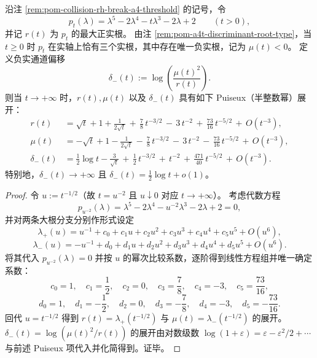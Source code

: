 
\begin{proposition}\label{prop:pom-a4t-puiseux-expansion-and-delta-asymptotics}
沿注 \ref{rem:pom-collision-rh-break-a4-threshold} 的记号，令
\[
p_t(\lambda)=\lambda^{5}-2\lambda^{4}-t\lambda^{3}-2\lambda+2\qquad(t>0),
\]
并记 \(r(t)\) 为 \(p_t\) 的最大正实根。
由注 \ref{rem:pom-a4t-discriminant-root-type}，当 \(t\ge 0\) 时 \(p_t\) 在实轴上恰有三个实根，其中存在唯一负实根，记为 \(\mu(t)<0\)。
定义负实通道偏移
\[
\delta_{-}(t):=\log\!\left(\frac{\mu(t)^2}{r(t)}\right).
\]
则当 \(t\to+\infty\) 时，\(r(t),\mu(t)\) 以及 \(\delta_{-}(t)\) 具有如下 Puiseux（半整数幂）展开：
\[
\begin{aligned}
r(t)
&=\sqrt t+1+\frac{1}{2\sqrt t}
\,+\,\frac{7}{8}\,t^{-3/2}
\,-\,3\,t^{-2}
\,+\,\frac{73}{16}\,t^{-5/2}
\, +\,O(t^{-3}),
\\[2pt]
\mu(t)
&=-\sqrt t+1-\frac{1}{2\sqrt t}
\,-\,\frac{7}{8}\,t^{-3/2}
\,-\,3\,t^{-2}
\,-\,\frac{73}{16}\,t^{-5/2}
\, +\,O(t^{-3}),
\\[2pt]
\delta_{-}(t)
&=\frac12\log t-\frac{3}{\sqrt t}
\,+\,\frac12\,t^{-3/2}
\,+\,t^{-2}
\,+\,\frac{471}{40}\,t^{-5/2}
\, +\,O(t^{-3}).
\end{aligned}
\]
特别地，\(\delta_{-}(t)\to+\infty\) 且 \(\delta_{-}(t)=\frac12\log t+o(1)\)。
\end{proposition}
\begin{proof}
令 \(u:=t^{-1/2}\)（故 \(t=u^{-2}\) 且 \(u\downarrow 0\) 对应 \(t\to+\infty\)）。
考虑代数方程
\[
p_{u^{-2}}(\lambda)=\lambda^5-2\lambda^4-u^{-2}\lambda^3-2\lambda+2=0,
\]
并对两条大根分支分别作形式设定
\[
\lambda_{+}(u)=u^{-1}+c_0+c_1u+c_2u^2+c_3u^3+c_4u^4+c_5u^5+O(u^6),
\]
\[
\lambda_{-}(u)=-u^{-1}+d_0+d_1u+d_2u^2+d_3u^3+d_4u^4+d_5u^5+O(u^6).
\]
将其代入 \(p_{u^{-2}}(\lambda)=0\) 并按 \(u\) 的幂次比较系数，逐阶得到线性方程组并唯一确定系数：
\[
c_0=1,\quad c_1=\frac12,\quad c_2=0,\quad c_3=\frac78,\quad c_4=-3,\quad c_5=\frac{73}{16},
\]
\[
d_0=1,\quad d_1=-\frac12,\quad d_2=0,\quad d_3=-\frac78,\quad d_4=-3,\quad d_5=-\frac{73}{16}.
\]
回代 \(u=t^{-1/2}\) 得到 \(r(t)=\lambda_{+}(t^{-1/2})\) 与 \(\mu(t)=\lambda_{-}(t^{-1/2})\) 的展开。
\(\delta_{-}(t)=\log(\mu(t)^2/r(t))\) 的展开由对数级数 \(\log(1+\varepsilon)=\varepsilon-\varepsilon^2/2+\cdots\) 与前述 Puiseux 项代入并化简得到。证毕。
\end{proof}


